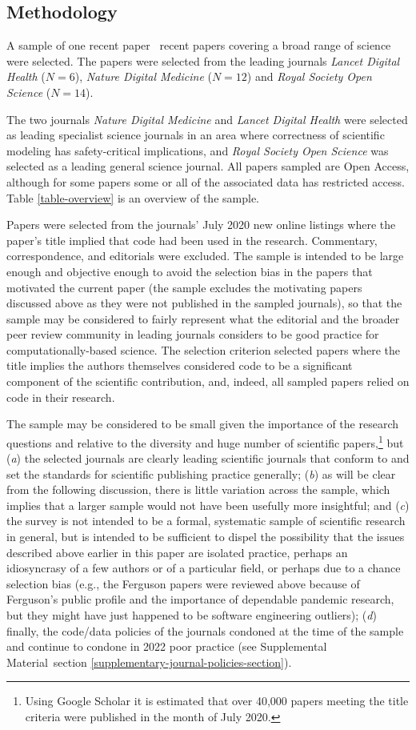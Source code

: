 \documentclass[10pt,letterpaper]{article}
\def\plural#1#2{\ifnum #1=1 
	one #2%
\else
	\the#1\ #2s%
\fi}
\def\journalBreakdown{\emph{Lancet Digital Health\/} ($N=6$), \emph{Nature Digital Medicine\/} ($N=12$) and \emph{Royal Society Open Science\/} ($N=14$)}
\def\supplement{Supplemental Material}
\begin{document}
\subsection{Methodology}
A sample of \plural{\dataN}{recent paper} covering a broad range of science were selected. The papers were selected from the leading journals \journalBreakdown. 

The two journals \emph{Nature Digital Medicine\/} and \emph{Lancet Digital Health\/} were selected as leading specialist science journals in an area where correctness of scientific modeling has safety-critical implications, and \emph{Royal Society Open Science\/} was selected as a leading general science journal. All papers sampled are Open Access, although for some papers some or all of the associated data has restricted access. Table \ref{table-overview} is an overview of the sample.  

Papers were selected from the journals' July 2020 new online listings where the paper's title implied that code had been used in the research. Commentary, correspondence, and editorials were excluded. The sample is intended to be large enough and objective enough to avoid the selection bias in the papers that motivated the current paper (the sample excludes the motivating papers discussed above as they were not published in the sampled journals), so that the sample may be considered to fairly represent what the editorial and the broader peer review community in leading journals considers to be good practice for computationally-based science. The selection criterion selected papers where the title implies the authors themselves considered code to be a significant component of the scientific contribution, and, indeed, all sampled papers relied on code in their research. 

The sample may be considered to be small given the importance of the research questions and relative to the diversity and huge number of scientific papers,\footnote{Using Google Scholar it is estimated that over 40,000 papers meeting the title criteria were published in the month of July 2020.} but (\emph{a\/}) the selected journals are clearly leading scientific journals that conform to and set the standards for scientific publishing practice generally; (\emph{b\/}) as will be clear from the following discussion, there is little variation across the sample, which implies that a larger sample would not have been usefully more insightful; and (\emph{c\/})
the survey is not intended to be a formal, systematic sample of scientific research in general, but is intended to be sufficient to dispel the possibility that the issues described above earlier in this paper are isolated practice, perhaps an idiosyncrasy of a few authors or of a particular field, or perhaps due to a chance selection bias (e.g., the Ferguson papers were reviewed above because of Ferguson's public profile and the importance of dependable pandemic research, but they might have just happened to be software engineering outliers); (\emph{d\/}) finally, the code/data policies of the journals condoned at the time of the sample and continue to condone in 2022 poor practice (see \supplement\ section  \ref{supplementary-journal-policies-section}).
\end{document}

